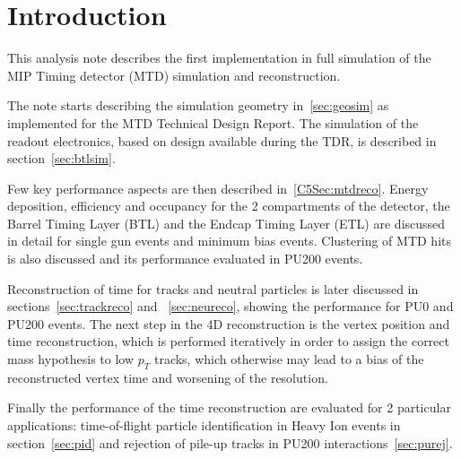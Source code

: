 \section{Introduction}
This analysis note describes the first implementation in full simulation of the MIP Timing detector (MTD) simulation and reconstruction.

The note starts describing the simulation geometry in~\ref{sec:geosim} as implemented for the MTD Technical Design Report. The simulation of the readout electronics, based on design available during the TDR, is described in section~\ref{sec:btlsim}.

Few key performance aspects are then described in~\ref{C5Sec:mtdreco}. Energy deposition, efficiency and occupancy for the 2 compartments of the detector, the Barrel Timing Layer (BTL) and the Endcap Timing Layer (ETL) are discussed in detail for single gun events and minimum bias events. Clustering of MTD hits is also discussed and its performance evaluated in PU200 events.

Reconstruction of time for tracks and neutral particles is later discussed in sections~\ref{sec:trackreco} and ~\ref{sec:neureco}, showing the performance for PU0 and PU200 events. The next step in the 4D reconstruction is the vertex position and time reconstruction, which is performed iteratively in order to assign the correct mass hypothesis to low $p_{T}$ tracks, which otherwise may lead to a bias of the reconstructed vertex time and worsening of the resolution. 

Finally the performance of the time reconstruction are evaluated for 2 particular applications: time-of-flight particle identification in Heavy Ion events in section~\ref{sec:pid} and rejection of pile-up tracks in PU200 interactions~\ref{sec:purej}.



